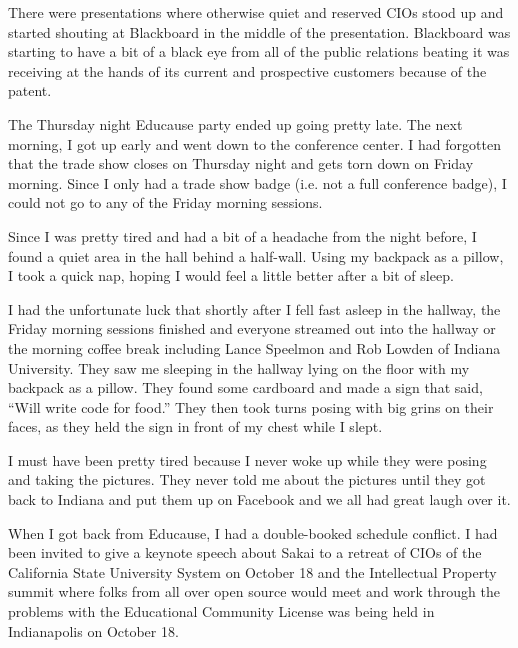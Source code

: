 \documentclass[12pt]{book}
\begin{document}
There were presentations where otherwise quiet and reserved
CIOs stood up and started shouting at Blackboard in the middle
of the presentation.  Blackboard was starting
to have a bit of a black eye from all of the public relations beating it was
receiving at the hands of its current and prospective customers
because of the patent.

The Thursday night Educause party ended up going
pretty late.  The next morning, I got up early
and went down to the
conference center.  I had forgotten that the trade
show closes on Thursday night and gets torn down
on Friday morning.   Since I only had a trade show badge
(i.e. not a full conference badge), I could not go
to any of the Friday morning sessions.

Since I was
pretty tired and had a bit of a headache from the
night before,  I found a quiet area in the hall
behind a half-wall.  Using my backpack as a pillow,
I took a quick nap, hoping I would feel
a little better after a bit of sleep.

I had the unfortunate luck that shortly after I fell
fast asleep in the hallway, the Friday morning
sessions finished and everyone streamed out into the hallway
or the morning coffee break including Lance Speelmon
and Rob Lowden of Indiana University.  They saw me
sleeping in the hallway lying on the floor with
my backpack as a pillow.  They found some
cardboard and made a sign that said, ``Will write
code for food.''  They then took turns posing with
big grins on their faces,
as they held the sign in front of my chest while I slept.

I must have been pretty tired because I never woke
up while they were posing and taking the pictures.
They never told me about the pictures until they
got back to Indiana and put them up
on Facebook and we all had great laugh over it.


When I got back from Educause, I had a double-booked
schedule conflict.  I had been invited to give a keynote
speech about Sakai to a retreat of CIOs of the
California State University System on October 18
and the Intellectual Property summit where folks
from all over open source would meet and work through
the problems with the Educational Community License
was being held in Indianapolis on October 18.
\end{document}
